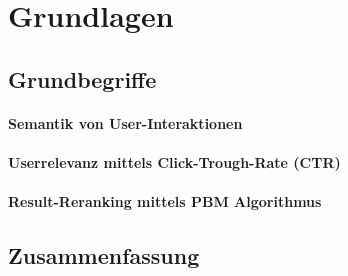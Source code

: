 %
\chapter{Grundlagen}
\label{sec:Grundlagen}



\section{Grundbegriffe}
\label{sec:Grundlagen:Grundbegriffe}

\subsubsection{Semantik von User-Interaktionen}
\label{sec:Grundlagen:SemantikUserInteraktionen}

\subsubsection{Userrelevanz mittels Click-Trough-Rate (CTR)}
\label{sec:Grundlagen:UserrelevanzCTR}

\subsubsection{Result-Reranking mittels PBM Algorithmus}
\label{sec:Grundlagen:Result-RerankingPBM}

\section{Zusammenfassung}
\label{sec:Grundlagen:Zusammenfassung}